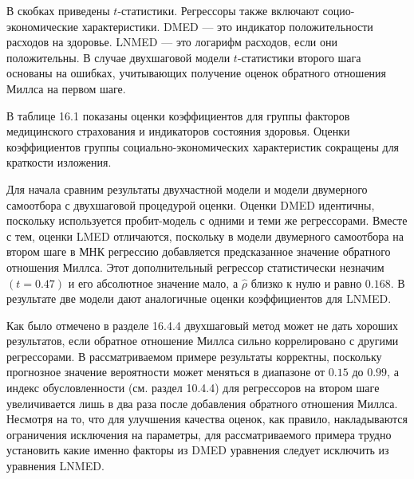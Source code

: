 В скобках приведены $t$-статистики. Регрессоры также включают социо-экономические характеристики. DMED --- это индикатор положительности расходов на здоровье. LNMED --- это логарифм расходов, если они положительны. В случае двухшаговой модели $t$-статистики второго шага основаны на ошибках, учитывающих получение оценок обратного отношения Миллса на первом шаге.


В таблице 16.1 показаны оценки коэффициентов для группы факторов медицинского страхования и индикаторов состояния здоровья. Оценки коэффициентов группы социально-экономических характеристик сокращены для краткости изложения.

Для начала сравним результаты двухчастной модели и модели двумерного самоотбора с двухшаговой процедурой оценки. Оценки DMED идентичны, поскольку используется пробит-модель с одними и теми же регрессорами. Вместе с тем, оценки LMED отличаются, поскольку в модели двумерного самоотбора на втором шаге в МНК регрессию добавляется предсказанное значение обратного отношения Миллса. Этот дополнительный регрессор статистически незначим $(t=0.47)$ и его абсолютное значение мало, а $\hat{\rho}$ близко к нулю и равно $0.168$. В результате две модели дают аналогичные оценки коэффициентов для LNMED.


Как было отмечено в разделе 16.4.4 двухшаговый метод может не дать хороших результатов, если обратное отношение Миллса сильно коррелировано с другими регрессорами. В рассматриваемом примере результаты корректны, поскольку прогнозное значение вероятности может меняться в диапазоне от $0.15$ до $0.99$, а индекс обусловленности (см. раздел 10.4.4) для регрессоров на втором шаге	увеличивается лишь в два раза после добавления обратного отношения Миллса. Несмотря на то, что для улучшения качества оценок, как правило, накладываются ограничения исключения на параметры, для рассматриваемого примера трудно установить какие именно факторы  из DMED уравнения следует исключить из уравнения LNMED.

